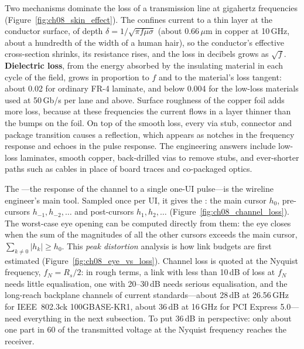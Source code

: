Two mechanisms dominate the loss of a transmission line at gigahertz frequencies
(Figure~\ref{fig:ch08_skin_effect}). The  confines current to a thin layer at
the conductor surface, of depth $\delta=1/\sqrt{\pi f\mu\sigma}$ (about 0.66\,$\mu$m in copper
at 10\,GHz, about a hundredth of the width of a human hair), so the conductor's effective
cross-section shrinks, its resistance rises, and the loss in decibels grows as $\sqrt f$.
\textbf{Dielectric loss}, from the energy absorbed by the insulating
material in each cycle of the field, grows in proportion to $f$ and to the material's loss
tangent: about 0.02 for ordinary FR-4 laminate, and below 0.004 for the low-loss materials used
at 50\,Gb/s per lane and above. Surface roughness of the copper foil adds more loss, because at
these frequencies the current flows in a layer thinner than the bumps on the foil. On top of
the smooth loss, every via stub, connector and package transition causes a reflection, which
appears as notches in the frequency response and echoes in the pulse response. The
engineering answers include low-loss laminates, smooth copper, back-drilled vias to remove
stubs, and ever-shorter paths such as cables in place of board traces and co-packaged optics.


The ---the response of the channel to a single one-UI pulse---is the
wireline engineer's main tool. Sampled once per UI, it gives the : the main
cursor $h_0$, pre-cursors $h_{-1},h_{-2},\dots$ and post-cursors $h_1,h_2,\dots$
(Figure~\ref{fig:ch08_channel_loss}). The worst-case eye opening can be computed directly from
them: the eye closes when the sum of the magnitudes of all the other cursors exceeds the main
cursor, $\sum_{k\ne0}|h_k|\ge h_0$. This \emph{peak distortion} analysis is how link budgets are
first estimated (Figure~\ref{fig:ch08_eye_vs_loss}). Channel loss is quoted at the Nyquist frequency, $f_N=R_s/2$: in rough terms, a
link with less than 10\,dB of loss at $f_N$ needs little equalisation, one with 20--30\,dB needs
serious equalisation, and the long-reach backplane channels of current standards---about
28\,dB at 26.56\,GHz for IEEE~802.3ck 100GBASE-KR1, about 36\,dB at 16\,GHz for PCI Express
5.0---need everything in the next subsection. To put 36\,dB in perspective: only about one
part in 60 of the transmitted voltage at the Nyquist frequency reaches the receiver.

